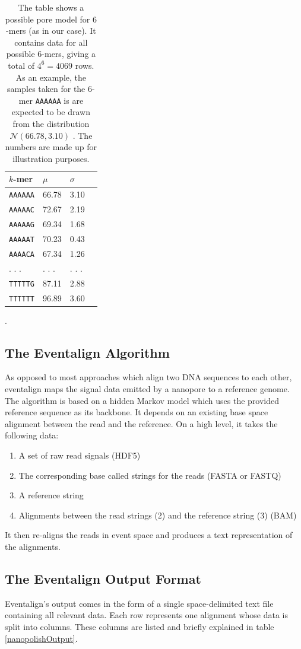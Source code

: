 \documentclass[times, utf, seminar]{fer}
\begin{document}
\begin{table}
	\centering
	\begin{tabular}{l l l l}
		$k$-mer & $\mu$ & $\sigma$  \\	
		\hline{}
		\texttt{AAAAAA} & 66.78 & 3.10  \\
		\texttt{AAAAAC} & 72.67 & 2.19 \\
		\texttt{AAAAAG} & 69.34 & 1.68 \\
		\texttt{AAAAAT} & 70.23 & 0.43 \\
		\texttt{AAAACA} & 67.34 & 1.26 \\
		. . .  & . . . & . . .  \\
		\texttt{TTTTTG} & 87.11 & 2.88 \\
		\texttt{TTTTTT} & 96.89 & 3.60 \\
	\end{tabular}
	\caption{The table shows a possible pore model for $6$-mers (as in our case). It contains data for all possible $6$-mers, giving a total of $4^6 = 4069$ rows. As an example, the samples taken for the $6$-mer \texttt{AAAAAA} is are expected to be drawn from the distribution $\mathcal{N}(66.78, 3.10)$ \citep{simpson}. The numbers are made up for illustration purposes.}.
	\label{poreModel}
\end{table}

\subsection{The Eventalign Algorithm}
As opposed to most approaches which align two DNA sequences to each other, eventalign maps 
the signal data emitted by a nanopore to a reference genome. The algorithm is based on a hidden Markov model which uses the provided reference sequence as its backbone. It depends on an existing base space alignment between the read and the reference. On a high level, it takes the following data:
\begin{enumerate}
	\item A set of raw read signals (HDF5)
	\item The corresponding base called strings for the reads (FASTA or FASTQ)
	\item A reference string
	\item Alignments between the read strings (2) and the reference string (3) (BAM)
\end{enumerate}
It then re-aligns the reads in event space and produces a text representation of the alignments.
\subsection{The Eventalign Output Format}
Eventalign's output comes in the form of a single space-delimited text file containing all relevant data. Each row represents one alignment whose data is split into columns. These columns are listed and briefly explained in table \ref{nanopolishOutput}.
\end{document}
